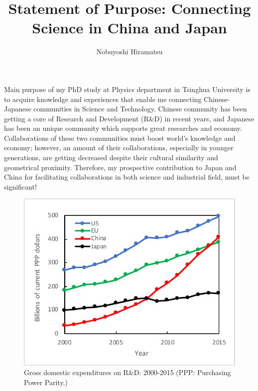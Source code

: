 \documentclass[aps,prb,reprint]{revtex4-1}
\begin{document}
\title{Statement of Purpose: Connecting Science in China and Japan}
\author{Nobuyoshi Hiramatsu}
\maketitle

Main purpose of my PhD study at Physics department in Tsinghua University is to acquire knowledge and experiences that enable me connecting Chinese-Japanese communities in Science and Technology. Chinese community has been getting a core of Research and Development (R\&D) in recent years\cite{RD}, and Japanese has been an unique community which supports great researches and economy. Collaborations of these two communities must boost world's knowledge and economy; however, an amount of their collaborations, especially in younger generations, are getting decreased despite their cultural similarity and geometrical proximity. Therefore, my prospective contribution to Japan and China for facilitating collaborations in both science and industrial field, must be significant! 
\vspace{-0.5zh}
\begin{figure}[h]
  \begin{center}
   \includegraphics[width=\hsize]{RD.pdf}
  \end{center}
  \vspace{-1zh}
  \caption{Gross domestic expenditures on R\&D: 2000-2015 (PPP: Purchasing Power Parity.)\cite{RD}}
  \label{fig:RD}
\end{figure}
\end{document}
